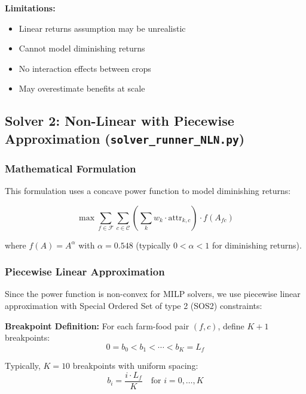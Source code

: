 \documentclass[11pt,a4paper]{article}
\begin{document}
\textbf{Limitations:}
\begin{itemize}
    \item Linear returns assumption may be unrealistic
    \item Cannot model diminishing returns
    \item No interaction effects between crops
    \item May overestimate benefits at scale
\end{itemize}

\subsection{Solver 2: Non-Linear with Piecewise Approximation (\texttt{solver\_runner\_NLN.py})}

\subsubsection{Mathematical Formulation}

This formulation uses a concave power function to model diminishing returns:

\begin{equation}
\max \sum_{f \in \mathcal{F}} \sum_{c \in \mathcal{C}} \left(\sum_{k} w_k \cdot \text{attr}_{k,c}\right) \cdot f(A_{fc})
\label{eq:nonlinear_obj}
\end{equation}

where $f(A) = A^\alpha$ with $\alpha = 0.548$ (typically $0 < \alpha < 1$ for diminishing returns).

\subsubsection{Piecewise Linear Approximation}

Since the power function is non-convex for MILP solvers, we use piecewise linear approximation with Special Ordered Set of type 2 (SOS2) constraints:

\textbf{Breakpoint Definition:}
For each farm-food pair $(f,c)$, define $K+1$ breakpoints:
\begin{equation}
0 = b_0 < b_1 < \cdots < b_K = L_f
\end{equation}

Typically, $K = 10$ breakpoints with uniform spacing:
\begin{equation}
b_i = \frac{i \cdot L_f}{K} \quad \text{for } i = 0, \ldots, K
\end{equation}
\end{document}
